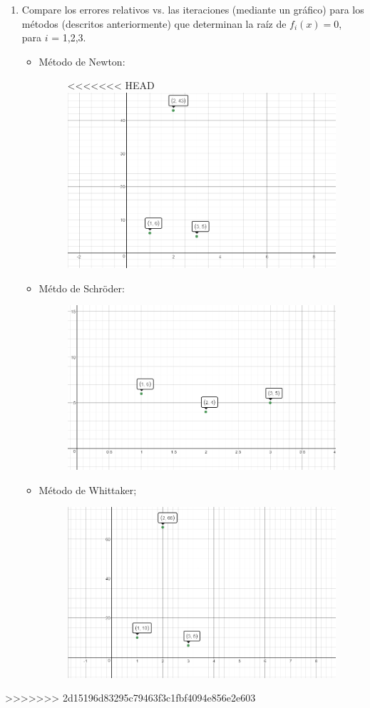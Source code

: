 \documentclass{udparticle}
\begin{document}
\begin{enumerate}
\begin{enumerate}
		\item Compare los errores relativos vs. las iteraciones (mediante un gráfico) para los métodos (descritos
			anteriormente) que determinan la raíz de $f_{i}(x)=0$, para $i$ = 1,2,3.	
			\begin{itemize}
				\item Método de Newton:
				\begin{figure}[H]
					\centering
<<<<<<< HEAD
					\includegraphics[width=10cm]{NewtonEj6} 
				\end{figure}								 
				
				
				\item Métdo de Schröder: 
				 \begin{figure}[H]
					\centering
					\includegraphics[width=10cm]{SchroderEj6} 
				\end{figure}	
				 
				 
				 \item Método de Whittaker;
				 \begin{figure}[H]
					\centering
					\includegraphics[width=10cm]{WhittakerEj6} 
				\end{figure}	
			\end{itemize}				
		
	
        \end{enumerate}
>>>>>>> 2d15196d83295c79463f3c1fbf4094e856e2e603
\end{enumerate}
\newpage
\end{document}
